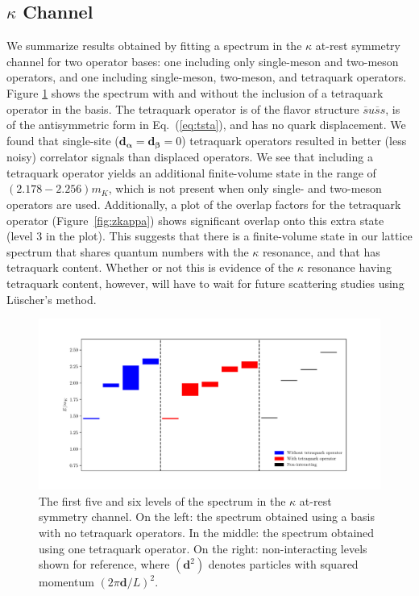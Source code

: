 \subsection{$\kappa$ Channel}
We summarize results obtained by fitting a spectrum in the $\kappa$ at-rest symmetry channel for two operator bases: one including only single-meson and two-meson operators, and one including single-meson, two-meson, and tetraquark operators. Figure \ref{fig:kappa_spectrum} shows the spectrum with and without the inclusion of a tetraquark operator in the basis. The tetraquark operator is of the flavor structure $\overline s u \overline s s$, is of the antisymmetric form in Eq.~(\ref{eq:tsta}), and has no quark displacement. We found that single-site ($\boldsymbol{d_\alpha} = \boldsymbol{d_\beta} = 0$) tetraquark operators resulted in better (less noisy) correlator signals than displaced operators. We see that including a tetraquark operator yields an additional finite-volume state in the range of $(2.178 - 2.256) m_K$, which is not present when only single- and two-meson operators are used. Additionally, a plot of the overlap factors for the tetraquark operator (Figure~\ref{fig:zkappa}) shows significant overlap onto this extra state (level 3 in the plot). This suggests that there is a finite-volume state in our lattice spectrum that shares quantum numbers with the $\kappa$ resonance, and that has tetraquark content. Whether or not this is evidence of the $\kappa$ resonance having tetraquark content, however, will have to wait for future scattering studies using Lüscher's method.
\begin{figure}
  \hspace{-0.4 in}\includegraphics[scale=0.7]{figures/a1g_staircase.pdf}
  \caption{The first five and six levels of the spectrum in the $\kappa$ at-rest symmetry channel. On the left: the spectrum obtained using a basis with no tetraquark operators. In the middle: the spectrum obtained using one tetraquark operator. On the right: non-interacting levels shown for reference, where $(\boldsymbol{d}^2)$ denotes particles with squared momentum $(2\pi\boldsymbol{d}/L)^2$.}\label{fig:kappa_spectrum}
\end{figure}
